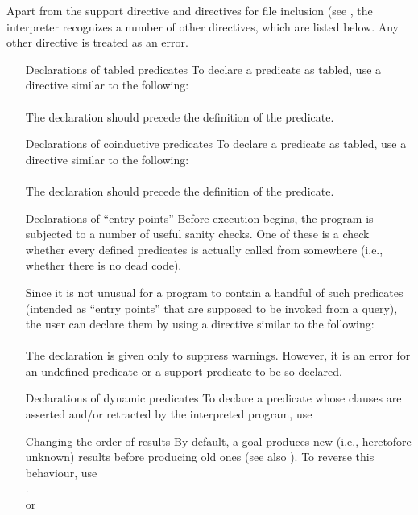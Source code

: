 Apart from the support directive and directives for file inclusion (see
, the interpreter recognizes a number of other
directives, which are listed below.  Any other directive is treated as an
error.
\begin{itemize}

\item [Declarations of tabled predicates]
  To declare a predicate as tabled, use a directive similar to the following:\\
  \ind{}\\
  The declaration should precede the definition of the predicate.

\item [Declarations of coinductive predicates]
  To declare a predicate as tabled, use a directive similar to the following:\\
  \ind{}\\
  The declaration should precede the definition of the predicate.

\item [Declarations of ``entry points'']
  Before execution begins, the program is subjected to a number of useful
  sanity checks.  One of these is a check whether every defined predicates
  is actually called from somewhere (i.e., whether there is no dead code).

  Since it is not unusual for a program to contain a handful of such
  predicates (intended as ``entry points'' that are supposed to be invoked
  from a query), the user can declare them by using a directive similar to
  the following:\\
  \ind{}\\
  The declaration is given only to suppress warnings.  However, it is an
  error for an undefined predicate or a support predicate to be so declared.

\item[Declarations of dynamic predicates]
  To declare a predicate whose clauses are asserted and/or retracted by the
  interpreted program, use\\
  \ind{}

\item[Changing the order of results\label{old-first}]
  By default, a goal produces new (i.e., heretofore unknown) results before
  producing old ones (see also ).  To reverse this
  behaviour,  use\\
  \ind{}.\\
  or\\


\end{itemize}
